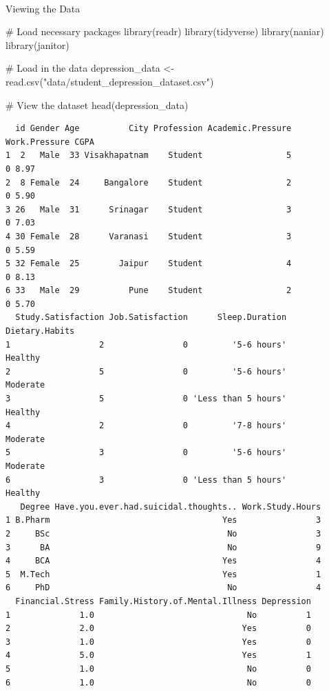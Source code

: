 \documentclass[
  letterpaper,
  DIV=11,
  numbers=noendperiod]{scrartcl}
\makeatletter
\let\oldparagraph\paragraph
\renewcommand{\paragraph}{
    \@ifstar
      \xxxParagraphStar
      \xxxParagraphNoStar
  }
\newcommand{\xxxParagraphStar}[1]{\oldparagraph*{#1}\mbox{}}
\newcommand{\xxxParagraphNoStar}[1]{\oldparagraph{#1}\mbox{}}
\newenvironment{Shaded}{\begin{snugshade}}{\end{snugshade}}
\newcommand{\CommentTok}[1]{\textcolor[rgb]{0.37,0.37,0.37}{#1}}
\newcommand{\FunctionTok}[1]{\textcolor[rgb]{0.28,0.35,0.67}{#1}}
\newcommand{\NormalTok}[1]{\textcolor[rgb]{0.00,0.23,0.31}{#1}}
\newcommand{\OtherTok}[1]{\textcolor[rgb]{0.00,0.23,0.31}{#1}}
\newcommand{\StringTok}[1]{\textcolor[rgb]{0.13,0.47,0.30}{#1}}
\makeatother
\begin{document}
\paragraph{Viewing the Data}\label{viewing-the-data}

\begin{Shaded}
\begin{Highlighting}[numbers=left,,]
\CommentTok{\# Load necessary packages}
\FunctionTok{library}\NormalTok{(readr)}
\FunctionTok{library}\NormalTok{(tidyverse)}
\FunctionTok{library}\NormalTok{(naniar)}
\FunctionTok{library}\NormalTok{(janitor)}

\CommentTok{\# Load in the data}
\NormalTok{depression\_data }\OtherTok{\textless{}{-}} \FunctionTok{read.csv}\NormalTok{(}\StringTok{"data/student\_depression\_dataset.csv"}\NormalTok{)}

\CommentTok{\# View the dataset}
\FunctionTok{head}\NormalTok{(depression\_data)}
\end{Highlighting}
\end{Shaded}

\begin{verbatim}
  id Gender Age          City Profession Academic.Pressure Work.Pressure CGPA
1  2   Male  33 Visakhapatnam    Student                 5             0 8.97
2  8 Female  24     Bangalore    Student                 2             0 5.90
3 26   Male  31      Srinagar    Student                 3             0 7.03
4 30 Female  28      Varanasi    Student                 3             0 5.59
5 32 Female  25        Jaipur    Student                 4             0 8.13
6 33   Male  29          Pune    Student                 2             0 5.70
  Study.Satisfaction Job.Satisfaction      Sleep.Duration Dietary.Habits
1                  2                0         '5-6 hours'        Healthy
2                  5                0         '5-6 hours'       Moderate
3                  5                0 'Less than 5 hours'        Healthy
4                  2                0         '7-8 hours'       Moderate
5                  3                0         '5-6 hours'       Moderate
6                  3                0 'Less than 5 hours'        Healthy
   Degree Have.you.ever.had.suicidal.thoughts.. Work.Study.Hours
1 B.Pharm                                   Yes                3
2     BSc                                    No                3
3      BA                                    No                9
4     BCA                                   Yes                4
5  M.Tech                                   Yes                1
6     PhD                                    No                4
  Financial.Stress Family.History.of.Mental.Illness Depression
1              1.0                               No          1
2              2.0                              Yes          0
3              1.0                              Yes          0
4              5.0                              Yes          1
5              1.0                               No          0
6              1.0                               No          0
\end{verbatim}
\end{document}
